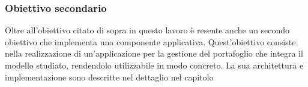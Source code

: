 \subsubsection{Obiettivo secondario}
Oltre all'obiettivo citato di sopra in questo lavoro è resente anche un secondo obiettivo che implementa una componente applicativa.
Quest'obiettivo consiste nella realizzazione di un'applicazione per la gestione del portafoglio che integra il modello studiato, rendendolo utilizzabile in modo concreto.
La sua architettura e implementazione sono descritte nel dettaglio nel capitolo %



